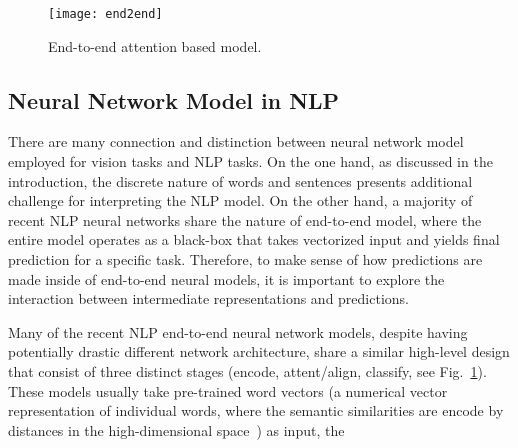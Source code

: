 

\begin{figure}[htbp]
\centering
\vspace{-2mm}
 \texttt{[image: end2end]}
 \caption{End-to-end attention based model.}
\label{fig:modelPipeline}
\end{figure}

\subsection{Neural Network Model in NLP}
There are many connection and distinction between neural network model employed for vision tasks and NLP tasks.
On the one hand, as discussed in the introduction, the discrete nature of words and sentences presents additional challenge for
interpreting the NLP model.
%
On the other hand, a majority of recent NLP neural networks share the nature of
end-to-end model, where the entire model operates as a black-box that takes
vectorized input and yields final prediction for a specific task.
Therefore, to make sense of how predictions are made inside of end-to-end neural models, it is important to
explore the interaction between intermediate representations and predictions.

Many of the recent NLP end-to-end neural network models, despite having potentially drastic different network architecture, share a similar high-level design that consist of three distinct stages (encode, attent/align, classify, see Fig.~\ref{fig:modelPipeline}). 
These models usually take pre-trained word vectors (a numerical vector representation of individual words, where the semantic similarities are encode by distances in the high-dimensional space~\cite{MikolovSutskeverChen2013, PenningtonSocherManning2014}) as input, the 

